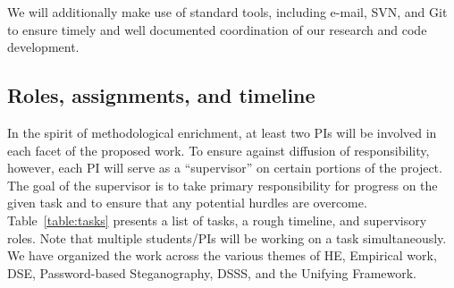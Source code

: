 We will additionally make use of standard tools, including e-mail, SVN, and Git to ensure timely and well documented coordination of our research and code development.


\subsection*{Roles, assignments, and timeline}
\label{subsection:timeline}

In the spirit of methodological enrichment, at least two PIs will be involved in
each facet of the proposed work.  To ensure against diffusion of responsibility,
however, each PI will serve as a ``supervisor'' on certain portions of the
project.  The goal of the supervisor is to take primary responsibility for
progress on the given task and to ensure that any potential hurdles are
overcome.  Table~\ref{table:tasks} presents a list of tasks, a rough timeline,
and supervisory roles.
Note that multiple students/PIs will be working on a task simultaneously. We have
organized the work across the various themes of HE, Empirical work, DSE,
Password-based Steganography, DSSS,
and the Unifying Framework.  

\bigskip


